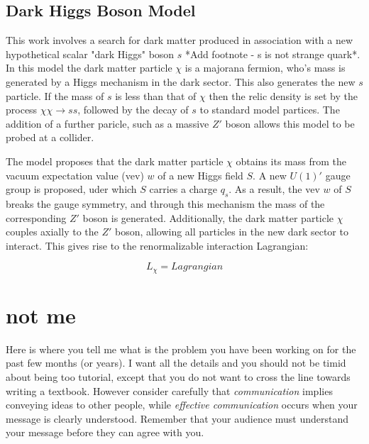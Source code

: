 \subsection{Dark Higgs Boson Model}
This work involves a search for dark matter produced in association with a new hypothetical scalar "dark Higgs" boson $s$ *Add footnote - s is not strange quark*. In this model the dark matter particle $\chi$ is a majorana fermion, who's mass is generated by a Higgs mechanism in the dark sector. This also generates the new $s$ particle. If the mass of $s$ is less than that of $\chi$ then the relic density is set by the process $\chi\chi \rightarrow ss$, followed by the decay of $s$ to standard model partices. The addition of a further paricle, such as a massive $Z'$ boson allows this model to be probed at a collider.

The model proposes that the dark matter particle $\chi$ obtains its mass from the vacuum expectation value (vev) $w$ of a new Higgs field $S$. A new $U(1)'$ gauge group is proposed, uder which $S$ carries a charge $q_s$. As a result, the vev $w$ of $S$ breaks the gauge symmetry, and through this mechanism the mass of the corresponding $Z'$ boson is generated. Additionally, the dark matter particle $\chi$ couples axially to the $Z'$ boson, allowing all particles in the new dark sector to interact. This gives rise to the renormalizable interaction Lagrangian:

$$ L_{\chi} = Lagrangian $$



































\section{not me}

Here is where you tell me what is the problem you have been working on for the past few months (or years). I want all the details and you should not be timid about being too tutorial, except that you do not want to cross the line towards writing a textbook. However consider carefully that \textit{communication} implies conveying ideas to other people, while \textit{effective communication} occurs when your message is clearly understood. Remember that your audience must understand your message before they can agree with you.

